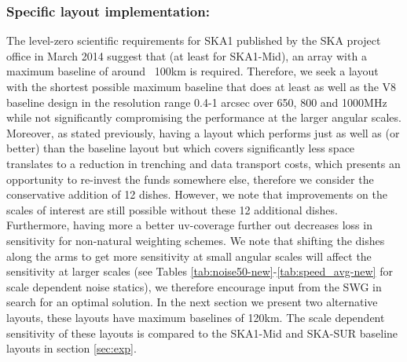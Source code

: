 \documentclass[sfheadings,a4paper,times,9pt,floats,floatfix]{article}
\begin{document}
\subsubsection{Specific layout implementation:}
The level-zero scientific requirements for SKA1\cite{srd} published by the SKA project office in March 2014
suggest that (at least for SKA1-Mid), an array with a maximum baseline of around ~100km is required. Therefore, we seek
a layout with the shortest possible maximum baseline that does at least as well as the V8 baseline design in the
resolution range 0.4-1 arcsec over 650, 800 and 1000MHz while not significantly compromising the performance at the
larger angular scales. Moreover, as stated previously, having a layout which performs just as well as (or better) than
the baseline layout but which covers significantly less space translates to a reduction in trenching and data transport
costs, which presents an opportunity to re-invest the funds somewhere else, therefore we consider the conservative
addition of 12 dishes. However, we note that improvements on the scales of interest are still possible without these 12
additional dishes. Furthermore, having more a better uv-coverage further out decreases loss in sensitivity for
non-natural weighting schemes. We note that shifting the dishes along the arms to get more sensitivity at small angular
scales will affect the sensitivity at larger scales (see Tables \ref{tab:noise50-new}-\ref{tab:speed_avg-new} for scale
dependent noise statics), we therefore encourage input from the SWG in search for an optimal solution. In the next
section we present two alternative layouts, these layouts have maximum baselines of 120km. The scale dependent
sensitivity of these layouts is compared to the SKA1-Mid and SKA-SUR baseline layouts in section \ref{sec:exp}.
\end{document}
